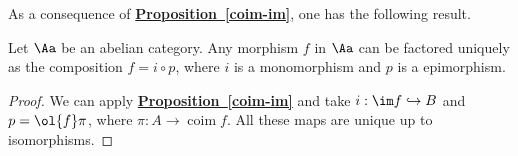 As a consequence of \hyperref[coim-im]{\textbf{Proposition~\ref*{coim-im}}},
one has the following result.

\begin{thm}
    Let $\Aa$ be an abelian category. Any morphism $f$ in $\Aa$
    can be factored uniquely as the composition $f = i \circ p$,
    where $i$ is a monomorphism and $p$ is a epimorphism.
    \begin{proof}
        We can apply \hyperref[coim-im]{\textbf{Proposition~\ref*{coim-im}}} 
        and take $i : \im f \hookrightarrow B$ and $p = \ol{f} \pi$,
        where $\pi : A \to \operatorname{coim}f$.
        All these maps are unique up to isomorphisms.
    \end{proof}
\end{thm}

